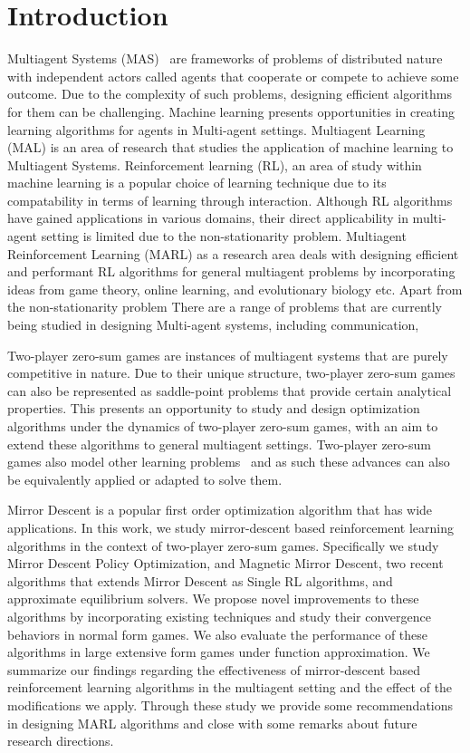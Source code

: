 \chapter{Introduction}

Multiagent Systems (MAS)~\cite{tuylsMultiagent2012} are frameworks of problems of distributed
nature with independent actors called agents that cooperate or compete to achieve some outcome.
Due to the complexity of such problems, designing efficient algorithms for them can be challenging.
Machine learning presents opportunities in creating learning algorithms for agents in Multi-agent
settings.
Multiagent Learning (MAL) is an area of research that studies the application of machine learning
to Multiagent Systems.
Reinforcement learning (RL), an area of study within machine learning is a popular choice of
learning technique due to its compatability in terms of learning through interaction.
Although RL algorithms have gained applications in various domains, their direct applicability in
multi-agent setting is limited due to the non-stationarity problem.
Multiagent Reinforcement Learning (MARL) as a research area deals with designing efficient and
performant RL algorithms for general multiagent problems by incorporating ideas from game theory,
online learning, and evolutionary biology etc. Apart from the non-stationarity problem There are a
range of problems that are currently being studied in designing Multi-agent systems, including
communication,

Two-player zero-sum games are instances of multiagent systems
that are purely competitive in nature.
Due to their unique structure, two-player zero-sum games can also be represented as saddle-point
problems that provide certain analytical properties.
This presents an opportunity to study and design optimization algorithms under the dynamics of
two-player zero-sum games, with an aim to extend these algorithms to general multiagent settings.
Two-player zero-sum games also model other learning problems~\cite{goodfellowGenerative2014} and as
such these advances can also be equivalently applied or adapted to solve them.

Mirror Descent is a popular first order optimization algorithm that has wide applications.
In this work, we study mirror-descent based reinforcement learning algorithms in the context of
two-player zero-sum games.
Specifically we study Mirror Descent Policy Optimization, and Magnetic Mirror Descent, two recent
algorithms that extends Mirror Descent as Single RL algorithms, and approximate equilibrium
solvers.
We propose novel improvements to these algorithms by incorporating existing techniques and study
their convergence behaviors in normal form games.
We also evaluate the performance of these algorithms in large extensive form games under function
approximation.
We summarize our findings regarding the effectiveness of mirror-descent based reinforcement
learning algorithms in the multiagent setting and the effect of the modifications we apply.
Through these study we provide some recommendations in designing MARL algorithms and close with
some remarks about future research directions.

